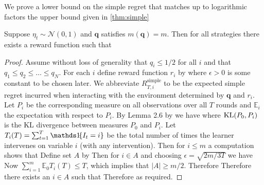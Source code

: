 \newcommand{\simpleregret}{R_T^{\text{simple}}}

We prove a lower bound on the simple regret that matches up to logarithmic factors the upper bound given in \cref{thm:simple}

\begin{theorem}\label{thm:lower}
Suppose $\eta_t \sim \mathcal N(0, 1)$ and $\boldsymbol{q}$ satisfies $m(\boldsymbol{q}) = m$.
Then for all strategies there exists a reward function such that
\eq{
\simpleregret \geq \frac{\frac{m}{2e} - 1}{m} \sqrt{\frac{2m}{3T}} = \Omega\left(\sqrt{\frac{m}{T}}\right)\,.
}
\end{theorem}

\begin{proof}
Assume without loss of generality that $q_i \leq 1/2$ for all $i$ and that $q_1 \leq q_2 \leq \ldots \leq q_N$.
For each $i$ define reward function $r_i$ by
where $\epsilon > 0$ is some constant to be chosen later.
We abbreviate $R_{T,i}^{\text{simple}}$ to be the expected simple regret incurred when interacting with the
environment determined by $\boldsymbol{q}$ and $r_i$. Let $P_i$ be the corresponding measure
on all observations over all $T$ rounds and $\mathbb E_i$ the expectation with respect to $P_i$. By Lemma 2.6 by \cite{Tsy08} we have
where $\operatorname{KL}(P_0, P_i)$ is the KL divergence between measures $P_0$ and $P_i$.
Let $T_i(T) = \sum_{t=1}^T \ind{I_t = i}$ be the total number of times the learner intervenes on variable $i$ (with any intervention). 
Then for $i \leq m$ a computation shows that 
Define set $A$ by
Then for $i \in A$ and choosing $\epsilon = \sqrt{2m/3T}$ we have
Now $\sum_{i=1}^m \mathbb E_0 T_i(T) \leq T$, which implies that $|A| \geq m/2$.
Therefore
Therefore there exists an $i \in A$ such that
Therefore
as required.
\end{proof}

